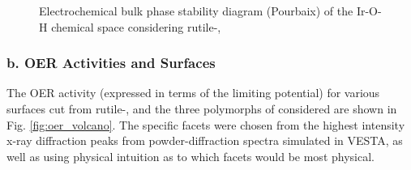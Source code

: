 \begin{figure}
\centering
{}
\caption{\label{fig:bulk_pourbaix}
Electrochemical bulk phase stability diagram (Pourbaix) of the Ir-O-H chemical space considering rutile-,
}
\end{figure}


\subsubsection{b. OER Activities and Surfaces}

The OER activity (expressed in terms of the limiting potential) for various surfaces cut from rutile-, and the three polymorphs of  considered are shown in Fig. \ref{fig:oer_volcano}.
The specific facets were chosen from the highest intensity x-ray diffraction peaks from powder-diffraction spectra simulated in VESTA,
as well as using physical intuition as to which facets would be most physical.


